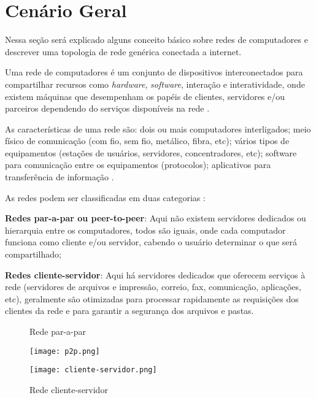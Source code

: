 
\section{Cenário Geral} \label{sec:cenario-geral}

Nessa seção será explicado alguns conceito básico sobre redes de computadores e descrever uma topologia de rede genérica conectada a internet.

Uma rede de computadores é um conjunto de dispositivos interconectados para compartilhar recursos como \textit{hardware}, \textit{software}, interação e interatividade, onde existem máquinas que desempenham os papéis de clientes, servidores e/ou parceiros dependendo do serviços disponíveis na rede \cite{modelo:jose}.

As características de uma rede são: dois ou mais computadores interligados; meio físico de comunicação (com fio, sem fio, metálico, fibra, etc); vários tipos de equipamentos (estações de usuários, servidores, concentradores, etc); software para comunicação entre os equipamentos (protocolos); aplicativos para transferência de informação \cite{esr:arquitetura}.

As redes podem ser classificadas em duas categorias \cite{esr:arquitetura}: 
\begin{alineas}
\item \textbf{Redes par-a-par ou peer-to-peer}: Aqui não existem servidores dedicados ou hierarquia entre os computadores, todos são iguais, onde cada computador funciona como cliente e/ou servidor, cabendo o usuário determinar o que será compartilhado;
\item \textbf{Redes cliente-servidor}: Aqui há servidores dedicados que oferecem serviços à rede (servidores de arquivos e impressão, correio, fax, comunicação, aplicações, etc), geralmente são otimizadas para processar rapidamente as requisições dos clientes da rede e para garantir a segurança dos arquivos e pastas.
\end{alineas}

\begin{figure}[htb]
 \label{fig:arq-redes}
 \centering
 \begin{minipage}{0.4\textwidth}
  \centering
  \label{fig:p2p}
  \caption{Rede par-a-par}
  \texttt{[image: p2p.png]}
 \end{minipage}
 \hfill
 \begin{minipage}{0.4\textwidth}
  \centering
  \label{fig:cliente-servidor}
  \caption{Rede cliente-servidor}
  \texttt{[image: cliente-servidor.png]}
 \end{minipage}
\end{figure}

